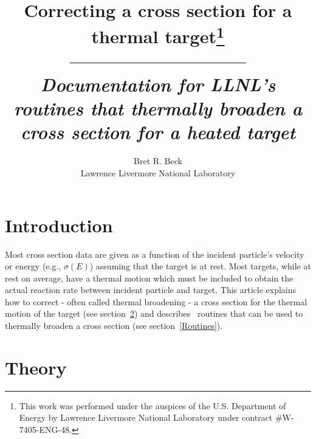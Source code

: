 \documentclass[11pt,twoside]{article}
\title{Correcting a cross section for a thermal target\footnote{
This work was performed under the auspices of the U.S. Department of Energy by
Lawrence Livermore National Laboratory under contract \#W-7405-ENG-48.} \\
--------------------------- \\
{\it Documentation for LLNL's routines that thermally broaden a cross section
for a heated target
}}
\author{{Bret R. Beck}\\Lawrence Livermore National Laboratory}
\begin{document}
\maketitle

\pagebreak

\section{Introduction}

Most cross section data are given as a function of the incident particle's velocity or energy (e.g., $\sigma(E)$) assuming that the target is
at rest. Most targets, while at rest on average, have a thermal motion which must be included to obtain the actual reaction rate between incident
particle and target.  This article explains how to correct - often called
thermal broadening - a cross section for the thermal motion of the target (see section~\ref{Theory}) and 
describes~\cite{Sigma1} routines that can be used to thermally broaden a cross section (see section~\ref{Routines}).

\section{Theory}     \label{Theory}
\end{document}

